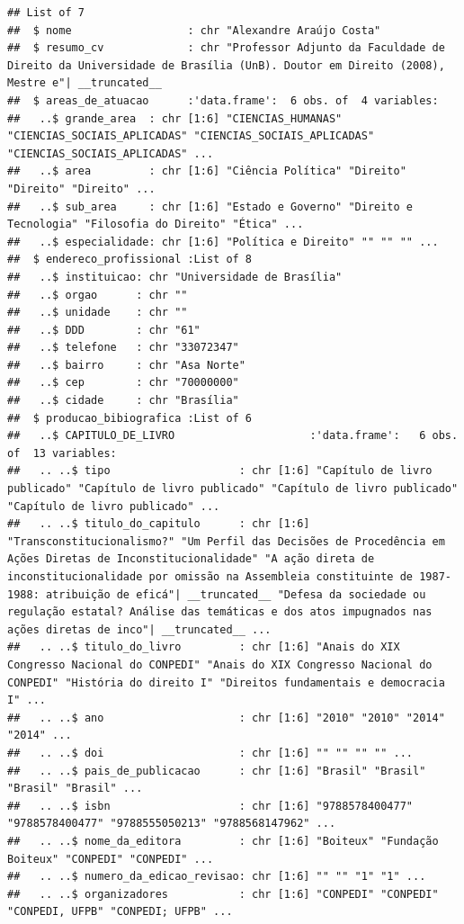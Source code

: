 \documentclass[]{article}
\begin{document}
\begin{verbatim}
## List of 7
##  $ nome                  : chr "Alexandre Araújo Costa"
##  $ resumo_cv             : chr "Professor Adjunto da Faculdade de Direito da Universidade de Brasília (UnB). Doutor em Direito (2008), Mestre e"| __truncated__
##  $ areas_de_atuacao      :'data.frame':  6 obs. of  4 variables:
##   ..$ grande_area  : chr [1:6] "CIENCIAS_HUMANAS" "CIENCIAS_SOCIAIS_APLICADAS" "CIENCIAS_SOCIAIS_APLICADAS" "CIENCIAS_SOCIAIS_APLICADAS" ...
##   ..$ area         : chr [1:6] "Ciência Política" "Direito" "Direito" "Direito" ...
##   ..$ sub_area     : chr [1:6] "Estado e Governo" "Direito e Tecnologia" "Filosofia do Direito" "Ética" ...
##   ..$ especialidade: chr [1:6] "Política e Direito" "" "" "" ...
##  $ endereco_profissional :List of 8
##   ..$ instituicao: chr "Universidade de Brasília"
##   ..$ orgao      : chr ""
##   ..$ unidade    : chr ""
##   ..$ DDD        : chr "61"
##   ..$ telefone   : chr "33072347"
##   ..$ bairro     : chr "Asa Norte"
##   ..$ cep        : chr "70000000"
##   ..$ cidade     : chr "Brasília"
##  $ producao_bibiografica :List of 6
##   ..$ CAPITULO_DE_LIVRO                     :'data.frame':   6 obs. of  13 variables:
##   .. ..$ tipo                    : chr [1:6] "Capítulo de livro publicado" "Capítulo de livro publicado" "Capítulo de livro publicado" "Capítulo de livro publicado" ...
##   .. ..$ titulo_do_capitulo      : chr [1:6] "Transconstitucionalismo?" "Um Perfil das Decisões de Procedência em Ações Diretas de Inconstitucionalidade" "A ação direta de inconstitucionalidade por omissão na Assembleia constituinte de 1987-1988: atribuição de eficá"| __truncated__ "Defesa da sociedade ou regulação estatal? Análise das temáticas e dos atos impugnados nas ações diretas de inco"| __truncated__ ...
##   .. ..$ titulo_do_livro         : chr [1:6] "Anais do XIX Congresso Nacional do CONPEDI" "Anais do XIX Congresso Nacional do CONPEDI" "História do direito I" "Direitos fundamentais e democracia I" ...
##   .. ..$ ano                     : chr [1:6] "2010" "2010" "2014" "2014" ...
##   .. ..$ doi                     : chr [1:6] "" "" "" "" ...
##   .. ..$ pais_de_publicacao      : chr [1:6] "Brasil" "Brasil" "Brasil" "Brasil" ...
##   .. ..$ isbn                    : chr [1:6] "9788578400477" "9788578400477" "9788555050213" "9788568147962" ...
##   .. ..$ nome_da_editora         : chr [1:6] "Boiteux" "Fundação Boiteux" "CONPEDI" "CONPEDI" ...
##   .. ..$ numero_da_edicao_revisao: chr [1:6] "" "" "1" "1" ...
##   .. ..$ organizadores           : chr [1:6] "CONPEDI" "CONPEDI" "CONPEDI, UFPB" "CONPEDI; UFPB" ...

\end{verbatim}
\end{document}
